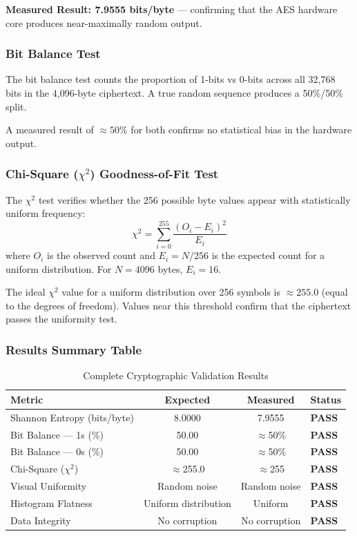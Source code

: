 \documentclass[12pt,a4paper]{article}
\begin{document}
\textbf{Measured Result: 7.9555 bits/byte} --- confirming that the AES hardware core produces near-maximally random output.

\subsubsection{Bit Balance Test}

The bit balance test counts the proportion of 1-bits vs 0-bits across all 32,768 bits in the 4,096-byte ciphertext. A true random sequence produces a 50\%/50\% split.

A measured result of $\approx 50\%$ for both confirms no statistical bias in the hardware output.

\subsubsection{Chi-Square ($\chi^2$) Goodness-of-Fit Test}

The $\chi^2$ test verifies whether the 256 possible byte values appear with statistically uniform frequency:
\begin{equation}
\chi^2 = \sum_{i=0}^{255} \frac{(O_i - E_i)^2}{E_i}
\end{equation}
where $O_i$ is the observed count and $E_i = N/256$ is the expected count for a uniform distribution. For $N = 4096$ bytes, $E_i = 16$.

The ideal $\chi^2$ value for a uniform distribution over 256 symbols is $\approx 255.0$ (equal to the degrees of freedom). Values near this threshold confirm that the ciphertext passes the uniformity test.

\subsubsection{Results Summary Table}

\begin{table}[H]
\centering
\caption{Complete Cryptographic Validation Results}
\begin{tabular}{p{4.5cm}ccp{2.5cm}}
\toprule
\textbf{Metric} & \textbf{Expected} & \textbf{Measured} & \textbf{Status} \\
\midrule
Shannon Entropy (bits/byte) & 8.0000 & 7.9555 & \textbf{\color{green!60!black}PASS} \\
Bit Balance --- 1s (\%)     & 50.00  & $\approx$50\%  & \textbf{\color{green!60!black}PASS} \\
Bit Balance --- 0s (\%)     & 50.00  & $\approx$50\%  & \textbf{\color{green!60!black}PASS} \\
Chi-Square ($\chi^2$)       & $\approx$255.0 & $\approx$255 & \textbf{\color{green!60!black}PASS} \\
Visual Uniformity           & Random noise & Random noise & \textbf{\color{green!60!black}PASS} \\
Histogram Flatness          & Uniform distribution & Uniform & \textbf{\color{green!60!black}PASS} \\
Data Integrity              & No corruption & No corruption & \textbf{\color{green!60!black}PASS} \\
\bottomrule
\end{tabular}
\end{table}
\end{document}
